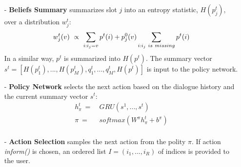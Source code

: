 \begin{itemize}
\item[-] \textbf{Beliefs Summary} summarizes slot $j$ into an entropy statistic, $H(p^{t}_{j})$, over a distribution $w^{t}_{j}$:
\begin{equation}
w^{t}_{j}(v) \ \propto \ \sum_{i:i_{j}=v} p^{t}(i) + p^{0}_{j}(v) \sum_{i:i_{j}\ is\ missing} p^{t}(i) \\
\end{equation}
In a similar way, $p^{t}$ is summarized into $H(p^{t})$. The summary vector $s^{t}=[H(p^{t}_{1}), ..., H(p^{t}_{M}), q^{t}_{1}, ..., q^{t}_{M}, H(p^{t})]$ is input to the policy network.

\item[-] \textbf{Policy Network} selects the next action based on the dialogue history and the current summary vector $s^{t}$:
\begin{equation}
\begin{aligned}
h^{t}_{\pi} \ =& \ GRU( s^{1}, ..., s^{t} ) \\
\pi \ =& \ softmax( W^{\pi}h^{t}_{\pi} + b^{\pi} ) \\
\end{aligned}
\end{equation}

\item[-] \textbf{Action Selection} samples the next action from the polity $\pi$. If action \emph{inform()} is chosen, an ordered list $I=(i_{1}, ..., i_{R})$ of indices is provided to the user.
\end{itemize}